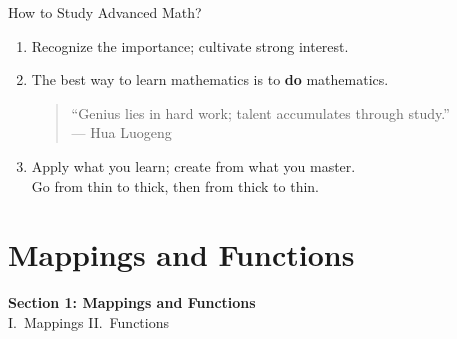 \documentclass[aspectratio=169,10pt]{beamer}
\begin{document}
\begin{frame}{How to Study Advanced Math?}
  \begin{enumerate}
    \item<1-> Recognize the importance; cultivate strong interest.
    \pause
    \item<2-> The best way to learn mathematics is to \textbf{do} mathematics.
          \begin{quote}
            ``Genius lies in hard work; talent accumulates through study.''\\
            \hfill --- Hua Luogeng
          \end{quote}
    \pause
    \item<3-> Apply what you learn; create from what you master.\\
          Go from thin to thick, then from thick to thin.
  \end{enumerate}
  \vspace{4pt}
\end{frame}

\section{Mappings and Functions}

\begin{frame}
  \centering
  \vfill
  {\Large\bfseries Section 1: Mappings and Functions}\\[8pt]
  {\large I.\ Mappings \quad\quad II.\ Functions}
  \vfill
\end{frame}
\end{document}
